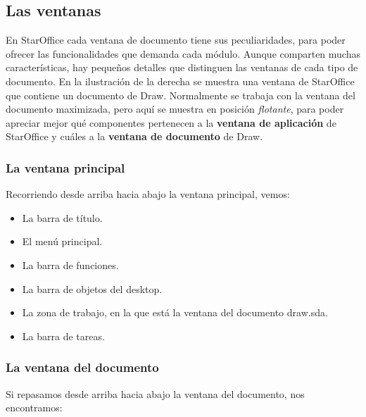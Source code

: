\subsection{Las ventanas}

En StarOffice cada ventana de documento tiene sus peculiaridades, para
poder ofrecer las funcionalidades que demanda cada módulo. Aunque
comparten muchas características, hay pequeños detalles que distinguen
las ventanas de cada tipo de documento.  En la ilustración de la
derecha se muestra una ventana de StarOffice que contiene un documento
de Draw. Normalmente se trabaja con la ventana del documento
maximizada, pero aquí se muestra en posición \emph{flotante}, para
poder apreciar mejor qué componentes pertenecen a la \textbf{ventana
de aplicación} de StarOffice y cuáles a la \textbf{ventana de
documento} de Draw.

\subsubsection{La ventana principal}

Recorriendo desde arriba hacia abajo la ventana principal, vemos:

\begin{itemize}
\item La barra de título.

\item El menú principal.

\item La barra de funciones.

\item La barra de objetos del desktop.

\item La zona de trabajo, en la que está la ventana del documento draw.sda.

\item La barra de tareas.
\end{itemize}

\subsubsection{La ventana del documento}

Si repasamos desde arriba hacia abajo la ventana del documento, nos
encontramos:

